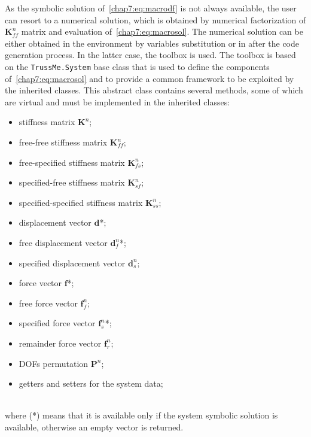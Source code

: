 As the symbolic solution of~\eqref{chap7:eq:macrodf} is not always available, the user can resort to a numerical solution, which is obtained by numerical factorization of $\mathbf{K}^{n}_{ff}$ matrix and evaluation of~\eqref{chap7:eq:macrosol}. The numerical solution can be either obtained in the \Maple{} environment by variables substitution or in \Matlab{} after the code generation process. In the latter case, the \TrussMe{} \Matlab{} toolbox is used. The toolbox is based on the \texttt{TrussMe.System} base class that is used to define the components of~\eqref{chap7:eq:macrosol} and to provide a common framework to be exploited by the inherited classes. This abstract class contains several methods, some of which are virtual and must be implemented in the inherited classes: \\[0.5em]
%
\begin{minipage}[t]{0.49\textwidth}
  \begin{itemize}
  \setlength{\itemsep}{-0.25em}
  \item stiffness matrix $\mathbf{K}^{n}$;
  \item free-free stiffness matrix $\mathbf{K}^{n}_{ff}$;
  \item free-specified stiffness matrix $\mathbf{K}^{n}_{fs}$;
  \item specified-free stiffness matrix $\mathbf{K}^{n}_{sf}$;
  \item specified-specified stiffness matrix $\mathbf{K}^{n}_{ss}$;
  \item displacement vector $\mathbf{d}$*;
  \item free displacement vector $\mathbf{d}^{n}_{f}$*;
  \end{itemize}
\end{minipage}
\hfill
\begin{minipage}[t]{0.49\textwidth}
  \begin{itemize}
  \setlength{\itemsep}{-0.25em}
  \item specified displacement vector $\mathbf{d}^{n}_{s}$;
  \item force vector $\mathbf{f}$*;
  \item free force vector $\mathbf{f}^{n}_{f}$;
  \item specified force vector $\mathbf{f}^{n}_{s}$*;
  \item remainder force vector $\mathbf{f}^{n}_{r}$;
  \item \acp{DOF} permutation $\mathbf{P}^{n}$;
  \item getters and setters for the system data;
  \end{itemize}
\end{minipage} \\[0.5em]
%
where (*) means that it is available only if the system symbolic solution is available, otherwise an empty vector is returned.

